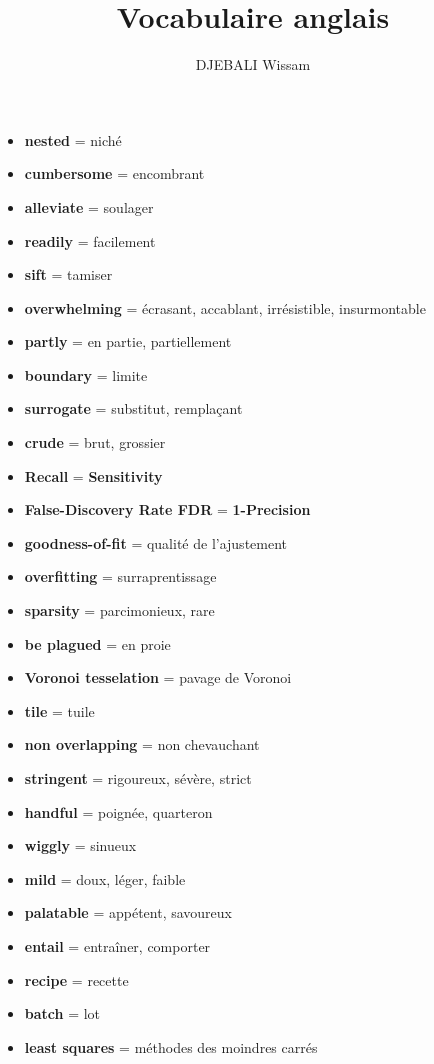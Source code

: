 \documentclass[french]{article}
\title{Vocabulaire anglais}
\author{DJEBALI Wissam}
\begin{document}
	\maketitle
	
\begin{itemize}[label=\textbullet]
	\item \textbf{nested} = niché
	\item \textbf{cumbersome} = encombrant 
	\item \textbf{alleviate} = soulager
	\item \textbf{readily} = facilement
	\item \textbf{sift} = tamiser
	\item \textbf{overwhelming} = écrasant, accablant, irrésistible, insurmontable
	\item \textbf{partly} = en partie, partiellement
	\item \textbf{boundary} = limite
	\item \textbf{surrogate} = substitut, remplaçant
	\item \textbf{crude} = brut, grossier
	\item \textbf{Recall} = \textbf{Sensitivity}
	\item \textbf{False-Discovery Rate FDR} = \textbf{1-Precision}
	\item \textbf{goodness-of-fit} = qualité de l'ajustement
	\item \textbf{overfitting} = surraprentissage
	\item \textbf{sparsity} = parcimonieux, rare
	\item \textbf{be plagued} = en proie
	\item \textbf{Voronoi tesselation} = pavage de Voronoi
	\item \textbf{tile} = tuile
	\item \textbf{non overlapping} = non chevauchant
	\item \textbf{stringent} = rigoureux, sévère, strict
	\item \textbf{handful} = poignée, quarteron
	\item \textbf{wiggly} = sinueux
	\item \textbf{mild} = doux, léger, faible
	\item \textbf{palatable} = appétent, savoureux
	\item \textbf{entail} = entraîner, comporter
	\item \textbf{recipe} = recette
	\item \textbf{batch} = lot
	\item  \textbf{least squares} = méthodes des moindres carrés

\end{itemize}
\end{document}
